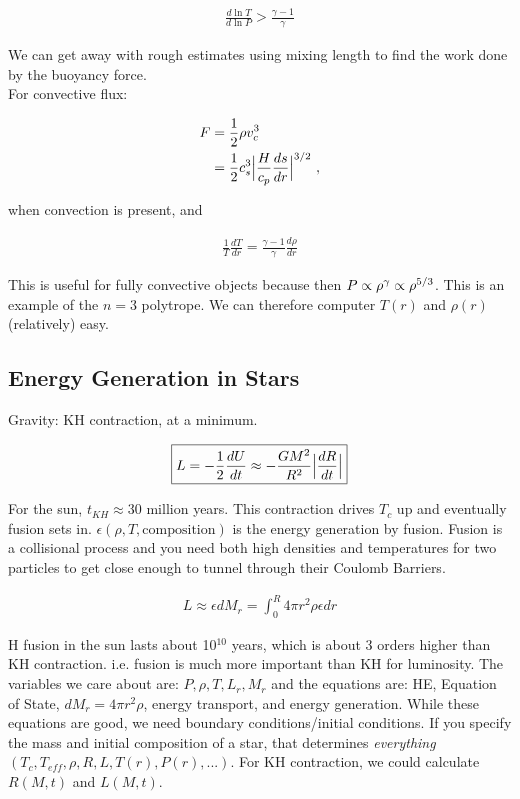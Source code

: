 \begin{align}
\frac{d \ln T}{d \ln P} > \frac{\gamma -1}{\gamma}
\end{align}

We can get away with rough estimates using mixing length to find the work done by the buoyancy force. \\
For convective flux:

\begin{align}
F &= \frac{1}{2}\rho v_c^3\\
&= \frac{1}{2} c_s^3 \Bigl\lvert \frac{H}{c_p} \frac{ds}{dr} \Bigl\lvert ^{3/2}~,
\end{align}

when convection is present, and

\begin{align}
\boxed{\frac{1}{T}\frac{dT}{dr} = \frac{\gamma -1}{\gamma} \frac{d\rho}{dr}}
\end{align}

This is useful for fully convective objects because then $P \propto \rho^\gamma \propto \rho^{5/3}$. This is an example of the $n=3$ polytrope. We can therefore computer $T(r)$ and $\rho(r)$ (relatively) easy.

\subsection{Energy Generation in Stars}


Gravity: KH contraction, at a minimum. 

\begin{align}
\boxed{L = -\frac{1}{2}\frac{dU}{dt}\approx -\frac{GM^2}{R^2} \Bigl\lvert \frac{dR}{dt} \Bigl\lvert}
\end{align}

For the sun, $t_{KH} \approx 30$ million years. This contraction drives $T_c$ up and eventually fusion sets in. $\epsilon(\rho,T,\text{composition})$ is the energy generation by fusion. Fusion is a collisional process and you need both high densities and temperatures for two particles to get close enough to tunnel through their Coulomb Barriers. 

\begin{align}
L \approx \epsilon dM_r = \int_0^R 4 \pi r^2 \rho \epsilon dr
\end{align}

H fusion in the sun lasts about 10$^{10}$ years, which is about 3 orders higher than KH contraction. i.e. fusion is much more important than KH for luminosity. The variables we care about are: $P, \rho, T , L_r , M_r$ and the equations are: HE, Equation of State, $dM_r = 4\pi r^2 \rho$, energy transport, and energy generation. While these equations are good, we need boundary conditions/initial conditions. If you specify the mass and initial composition of a star, that determines \textit{everything} $(T_c,T_{eff},\rho,R,L,T(r),P(r),...)$. For KH contraction, we could calculate $R(M, t)$ and $L(M, t)$.
